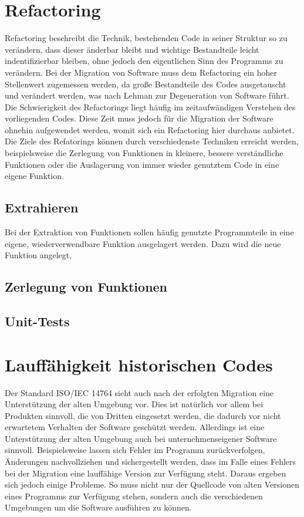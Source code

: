 \section{Refactoring} %
    Refactoring beschreibt die Technik, bestehenden Code in seiner Struktur so zu verändern, dass dieser änderbar bleibt und wichtige Bestandteile leicht indentifizierbar 
    bleiben, ohne jedoch den eigentlichen Sinn des Programms zu verändern. \cite{fowler_refactoring_1999} Bei der Migration von Software muss dem Refactoring ein hoher Stellenwert zugemessen werden, 
    da große Bestandteile des Codes ausgetauscht und verändert werden, was nach Lehman \cite[S. 1060-1076]{lehman_programs_1980} zur Degeneration von Software führt.
    Die Schwierigkeit des Refactorings liegt häufig im zeitaufwändigen Verstehen des vorliegenden Codes. Diese Zeit muss jedoch für die Migration der Software ohnehin 
    aufgewendet werden, womit sich ein Refactoring hier durchaus anbietet.
    Die Ziele des Refatorings können durch verschiedenste Techniken erreicht werden, beispielsweise die Zerlegung von Funktionen in kleinere, bessere verständliche 
    Funktionen oder die Auslagerung von immer wieder genutztem Code in eine eigene Funktion.
    \subsection{Extrahieren}
        Bei der Extraktion von Funktionen sollen häufig genutzte Programmteile in eine eigene, wiederverwendbare Funktion ausgelagert werden. Dazu wird die neue Funktion
        angelegt, 
    \subsection{Zerlegung von Funktionen}
    \subsection{Unit-Tests}

\section{Lauffähigkeit historischen Codes}
    Der Standard ISO/IEC 14764 sieht auch nach der erfolgten Migration eine Unterstützung der alten Umgebung vor. Dies ist natürlich vor allem bei Produkten sinnvoll, 
    die von Dritten eingesetzt werden, die dadurch vor nicht erwartetem Verhalten der Software geschützt werden. Allerdings ist eine Unterstützung der alten Umgebung 
    auch bei unternehmenseigener Software sinnvoll. Beispielsweise lassen sich Fehler im Programm zurückverfolgen, Änderungen nachvollziehen und sichergestellt werden,
    dass im Falle eines Fehlers bei der Migration eine lauffähige Version zur Verfügung steht. Daraus ergeben sich jedoch einige Probleme. So muss nicht nur der Quellcode 
    von alten Versionen eines Programms zur Verfügung stehen, sondern auch die verschiedenen Umgebungen um die Software ausführen zu können.
